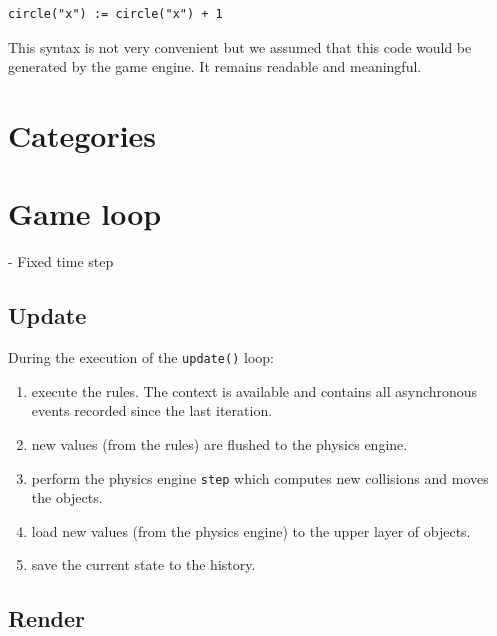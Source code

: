 \documentclass[11pt,a4paper]{article}
\begin{document}
\begin{lstlisting}
circle("x") := circle("x") + 1
\end{lstlisting}

This syntax is not very convenient but we assumed that this code would be generated by the game engine. It remains readable and meaningful.


\section{Categories}

\section{Game loop}

- Fixed time step

\subsection{Update}

During the execution of the \texttt{update()} loop:
\begin{enumerate}
\item execute the rules. The context is available and contains all asynchronous events recorded since the last iteration.
\item new values (from the rules) are flushed to the physics engine.
\item perform the physics engine \texttt{step} which computes new collisions and moves the objects.
\item load new values (from the physics engine) to the upper layer of objects.
\item save the current state to the history.
\end{enumerate}

\subsection{Render}
\end{document}
